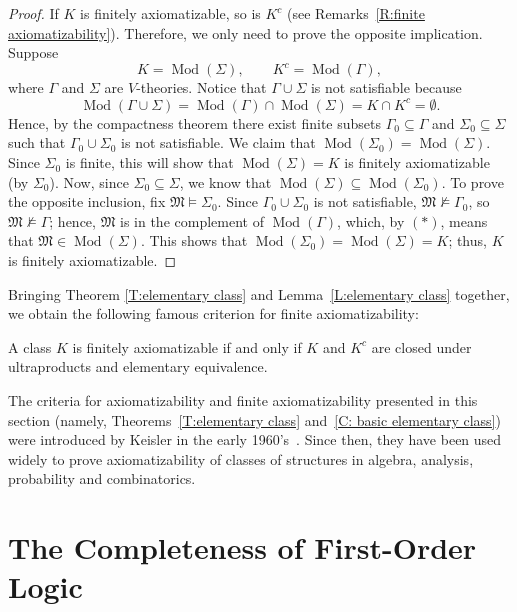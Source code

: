 \documentclass{scrartcl}
\DeclareMathOperator{\Mod}{Mod}
\begin{document}
\begin{proof}
If $K$ is finitely axiomatizable, so is $K^c$ (see Remarks~\ref{R:finite axiomatizability}). Therefore, we only need to prove the opposite implication.
Suppose
\[
\tag{*}
K=\Mod(\Sigma),
\qquad
K^c=\Mod(\Gamma),
\]
where $\Gamma$ and $\Sigma$ are $V$-theories. Notice that $\Gamma\cup\Sigma$ is not satisfiable because 
 \[
 \Mod(\Gamma\cup \Sigma)=\Mod(\Gamma)\cap\Mod(\Sigma)=K\cap K^c=\emptyset.
 \]
Hence, by the compactness theorem there exist finite subsets $\Gamma_0\subseteq\Gamma$ and $\Sigma_0\subseteq\Sigma$ such that $\Gamma_0\cup\Sigma_0$ is not satisfiable. 
We claim that $\Mod(\Sigma_0)=\Mod(\Sigma)$.
Since $\Sigma_0$ is finite, this will show that $\Mod(\Sigma)=K$ is finitely axiomatizable (by $\Sigma_0$).
Now, since  $\Sigma_0\subseteq\Sigma$, we know that $\Mod(\Sigma)\subseteq\Mod(\Sigma_0)$. To prove the opposite inclusion,
fix $\mathfrak{M}\models\Sigma_0$.
Since $\Gamma_0\cup\Sigma_0$ is not satisfiable, $\mathfrak{M}\not\models\Gamma_0$, so $\mathfrak{M}\not\models\Gamma$; hence, $\mathfrak{M}$ is in the complement of $\Mod(\Gamma)$, which, by $(*)$, means that  $\mathfrak{M}\in\Mod(\Sigma)$. 
This shows that  $\Mod(\Sigma_0)=\Mod(\Sigma)=K$; thus, $K$ is finitely axiomatizable.
\end{proof}

Bringing Theorem \ref{T:elementary class} and Lemma~\ref{L:elementary class} together, we obtain the following famous criterion for finite axiomatizability:


\begin{theorem}
\label{C: basic elementary class}
A class $K$ is finitely axiomatizable if and only if $K$ and $K^c$ are closed under ultraproducts and elementary equivalence.
\end{theorem}

\begin{history}
The criteria for axiomatizability and finite axiomatizability presented in this section (namely, Theorems~\ref{T:elementary class} and~\ref{C: basic elementary class}) were introduced by Keisler in the early 1960's~\cite{Keisler:1961}. Since then, they have been used widely to prove axiomatizability of classes of structures in algebra, analysis, probability and combinatorics.
\end{history}

\section{The Completeness of First-Order Logic}
\end{document}
